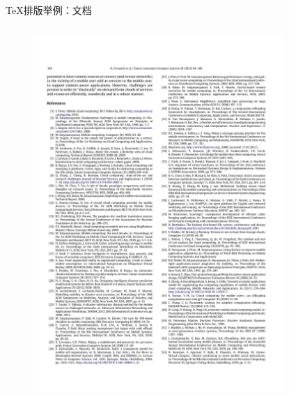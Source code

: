 \documentclass[xcolor=table,dvipsnames,svgnames]{beamer}
\begin{document}
\begin{frame}{\TeX{}排版举例：文档}
  \begin{columns}
    \begin{column}{.45\textwidth}
      \begin{figure}[h]
        \centering
        \includegraphics[width=\textwidth]{references.pdf}
      \end{figure}
    \end{column}
    \begin{column}{.45\textwidth}
      \begin{figure}[h]
        \centering

\end{figure}
\end{column}
\end{columns}
\end{frame}
\end{document}
